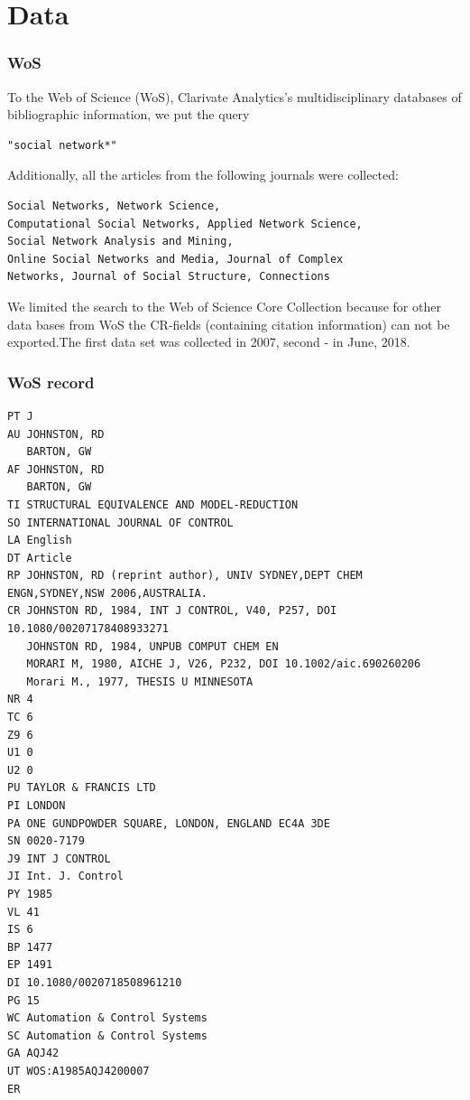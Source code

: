 \documentclass[hyperref={pdfstartview={FitBH -32768},
                         pdfpagemode=FullScreen,
                         plainpages=false,
                         colorlinks=true}
              ]{beamer}
\begin{document}
\section{Data}

\begin{frame}[fragile]
\frametitle{WoS}
\small

To the Web of Science (WoS), Clarivate Analytics’s multidisciplinary databases of bibliographic
information, we put the query
\begin{verbatim} 
"social network*"
\end{verbatim}
Additionally, all the articles from the following journals were collected:
\begin{verbatim}
Social Networks, Network Science, 
Computational Social Networks, Applied Network Science, 
Social Network Analysis and Mining,
Online Social Networks and Media, Journal of Complex 
Networks, Journal of Social Structure, Connections 
\end{verbatim}
We limited the search to the Web of Science Core Collection because for other data bases from WoS the CR-fields (containing citation information) can not
be exported.The first data set was collected in 2007, second - in June, 2018. 
\end{frame}

\begin{frame}[fragile]
\frametitle{WoS record}
\renewcommand{\baselinestretch}{0.8}
\tiny
\begin{verbatim}
PT J
AU JOHNSTON, RD
   BARTON, GW
AF JOHNSTON, RD
   BARTON, GW
TI STRUCTURAL EQUIVALENCE AND MODEL-REDUCTION
SO INTERNATIONAL JOURNAL OF CONTROL
LA English
DT Article
RP JOHNSTON, RD (reprint author), UNIV SYDNEY,DEPT CHEM ENGN,SYDNEY,NSW 2006,AUSTRALIA.
CR JOHNSTON RD, 1984, INT J CONTROL, V40, P257, DOI 10.1080/00207178408933271
   JOHNSTON RD, 1984, UNPUB COMPUT CHEM EN
   MORARI M, 1980, AICHE J, V26, P232, DOI 10.1002/aic.690260206
   Morari M., 1977, THESIS U MINNESOTA
NR 4
TC 6
Z9 6
U1 0
U2 0
PU TAYLOR & FRANCIS LTD
PI LONDON
PA ONE GUNDPOWDER SQUARE, LONDON, ENGLAND EC4A 3DE
SN 0020-7179
J9 INT J CONTROL
JI Int. J. Control
PY 1985
VL 41
IS 6
BP 1477
EP 1491
DI 10.1080/0020718508961210
PG 15
WC Automation & Control Systems
SC Automation & Control Systems
GA AQJ42
UT WOS:A1985AQJ4200007
ER
\end{verbatim}

\end{frame}
\end{document}
